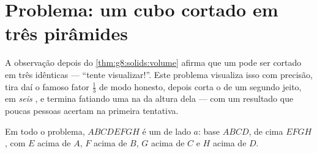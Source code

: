 \section{Problema: um cubo cortado em três pirâmides}

\begin{problem}
\label{pb:g8:solids:1}
A observação depois do \cref{thm:g8:solids:volume} afirma que um 
pode ser cortado em três  idênticas --- ``tente
visualizar!''. Este problema visualiza isso com precisão, tira daí o
famoso fator $\frac13$ de modo honesto, depois corta o  de um
segundo jeito, em \emph{seis} , e termina fatiando uma
 na  da altura dela --- com um resultado que poucas
pessoas acertam na primeira tentativa.

Em todo o problema, $ABCDEFGH$ é um  de lado $a$: base $ABCD$,
 de cima $EFGH$, com $E$ acima de $A$, $F$ acima de $B$, $G$ acima
de $C$ e $H$ acima de $D$.


\end{problem}
